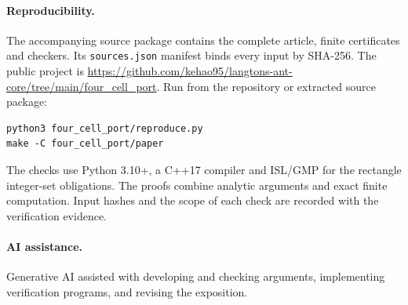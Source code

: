 \documentclass[11pt]{article}
\begin{document}
\paragraph{Reproducibility.}
The accompanying source package contains the complete article, finite
certificates and checkers. Its \texttt{sources.json} manifest binds every input
by SHA-256. The public project is
\url{https://github.com/kehao95/langtons-ant-core/tree/main/four_cell_port}.
Run from the repository or extracted source package:
\begin{verbatim}
python3 four_cell_port/reproduce.py
make -C four_cell_port/paper
\end{verbatim}
The checks use Python 3.10+, a C++17 compiler and ISL/GMP for the rectangle integer-set obligations. The proofs combine analytic arguments and exact
finite computation. Input hashes and the scope of each check are recorded
with the verification evidence.

\paragraph{AI assistance.}
Generative AI assisted with developing and checking arguments, implementing
verification programs, and revising the exposition.

\appendix


\end{document}
